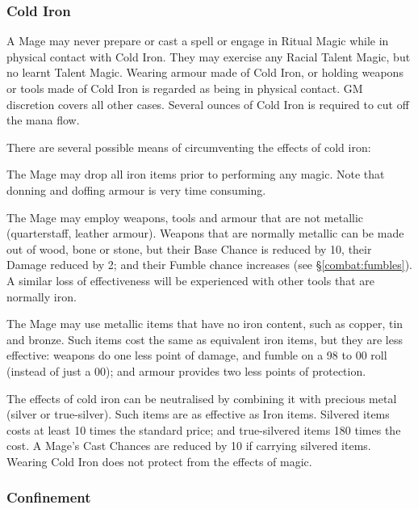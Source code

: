 \begin{multicols*}{3}
\subsubsection{Cold Iron}

A Mage may never prepare or cast a spell or engage in Ritual Magic
while in physical contact with Cold Iron. They may exercise any Racial
Talent Magic, but no learnt Talent Magic. Wearing armour made of Cold
Iron, or holding weapons or tools made of Cold Iron is regarded as
being in physical contact. GM discretion covers all other
cases. Several ounces of Cold Iron is required to cut off the mana
flow.

There are several possible means of circumventing the effects of cold
iron:

\begin{Itemize}
\item The Mage may drop all iron items prior to performing any
magic. Note that donning and doffing armour is very time consuming.

\item The Mage may employ weapons, tools and armour that are not
metallic (\eg quarterstaff, leather armour).  Weapons that are
normally metallic can be made out of wood, bone or stone, but their
Base Chance is reduced by 10, their Damage reduced by 2; and their
Fumble chance increases (see \S\ref{combat:fumbles}).  A similar loss of
effectiveness will be experienced with other tools that are normally
iron.

\item The Mage may use metallic items that have no iron content, such
as copper, tin and bronze. Such items cost the same as equivalent iron
items, but they are less effective: weapons do one less point of
damage, and fumble on a 98 to 00 roll (instead of just a 00); and
armour provides two less points of protection.

\item The effects of cold iron can be neutralised by combining it with
precious metal (silver or true-silver). Such items are as effective as
Iron items. Silvered items costs at least 10 times the standard price;
and true-silvered items 180 times the cost. A Mage's Cast Chances are
reduced by 10 if carrying silvered items.  Wearing Cold Iron does not
protect from the effects of magic.
\end{Itemize}

\subsubsection{Confinement}


\end{multicols*}

